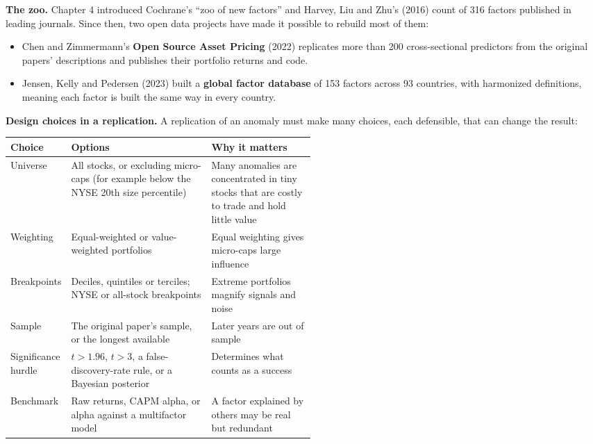 \textbf{The zoo.} Chapter 4 introduced Cochrane's ``zoo of new factors'' and Harvey, Liu and Zhu's (2016) count of 316 factors published in leading journals. Since then, two open data projects have made it possible to rebuild most of them:

\begin{itemize}
  \item Chen and Zimmermann's \textbf{Open Source Asset Pricing} (2022) replicates more than 200 cross-sectional predictors from the original papers' descriptions and publishes their portfolio returns and code.
  \item Jensen, Kelly and Pedersen (2023) built a \textbf{global factor database} of 153 factors across 93 countries, with harmonized definitions, meaning each factor is built the same way in every country.
\end{itemize}

\textbf{Design choices in a replication.} A replication of an anomaly must make many choices, each defensible, that can change the result:

\begin{center}
\small
\begin{tabularx}{0.9\linewidth}{@{}>{\raggedright\arraybackslash}p{0.17\linewidth}>{\raggedright\arraybackslash}X>{\raggedright\arraybackslash}p{0.34\linewidth}@{}}
\toprule
Choice & Options & Why it matters \\
\midrule
Universe & All stocks, or excluding micro-caps (for example below the NYSE 20th size percentile) & Many anomalies are concentrated in tiny stocks that are costly to trade and hold little value \\
Weighting & Equal-weighted or value-weighted portfolios & Equal weighting gives micro-caps large influence \\
Breakpoints & Deciles, quintiles or terciles; NYSE or all-stock breakpoints & Extreme portfolios magnify signals and noise \\
Sample & The original paper's sample, or the longest available & Later years are out of sample \\
Significance hurdle & $t > 1.96$, $t > 3$, a false-discovery-rate rule, or a Bayesian posterior & Determines what counts as a success \\
Benchmark & Raw returns, CAPM alpha, or alpha against a multifactor model & A factor explained by others may be real but redundant \\
\bottomrule
\end{tabularx}
\end{center}

